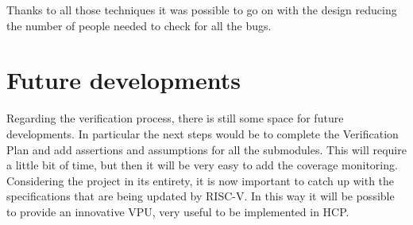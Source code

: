 Thanks to all those techniques it was possible to go on with the design reducing the number of people needed to check for all the bugs.\\

\section{Future developments}
Regarding the verification process, there is still some space for future developments. In particular the next steps would be to complete the Verification Plan and add assertions and assumptions for all the submodules. This will require a little bit of time, but then it will be very easy to add the coverage monitoring. \\

Considering the project in its entirety, it is now important to catch up with the specifications that are being updated by RISC-V. In this way it will be possible to provide an innovative VPU, very useful to be implemented in HCP.